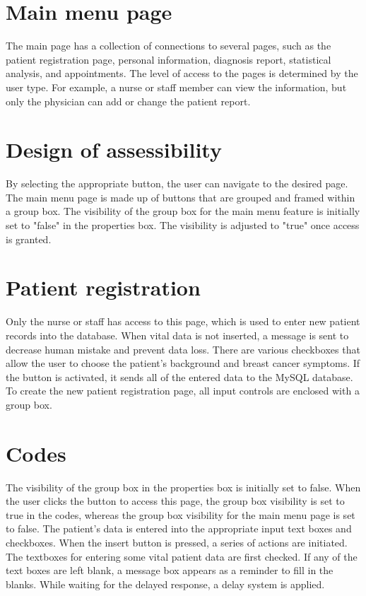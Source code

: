 \documentclass[10pt,a4paper,twoside]{article}
\begin{document}
\section{Main menu page}
The main page has a collection of connections to several pages, such as the patient registration page, personal information, diagnosis report, statistical analysis, and appointments.
The level of access to the pages is determined by the user type. For example, a nurse or staff member can view the information, but only the physician can add or change the patient report.

\section{ Design of assessibility}

By selecting the appropriate button, the user can navigate to the desired page. The main menu page is made up of buttons that are grouped and framed within a group box. The visibility of the group box for the main menu feature is initially set to "false" in the properties box. The visibility is adjusted to "true" once access is granted.

\section{Patient registration}

Only the nurse or staff has access to this page, which is used to enter new patient records into the database. When vital data is not inserted, a message is sent to decrease human mistake and prevent data loss. There are various checkboxes that allow the user to choose the patient's background and breast cancer symptoms. If the button is activated, it sends all of the entered data to the MySQL database. To create the new patient registration page, all input controls are enclosed with a group box.

\section{Codes}

The visibility of the group box in the properties box is initially set to false. When the user clicks the button to access this page, the group box visibility is set to true in the codes, whereas the group box visibility for the main menu page is set to false. The patient's data is entered into the appropriate input text boxes and checkboxes. When the insert button is pressed, a series of actions are initiated. The textboxes for entering some vital patient data are first checked. If any of the text boxes are left blank, a message box appears as a reminder to fill in the blanks. While waiting for the delayed response, a delay system is applied.
\end{document}
